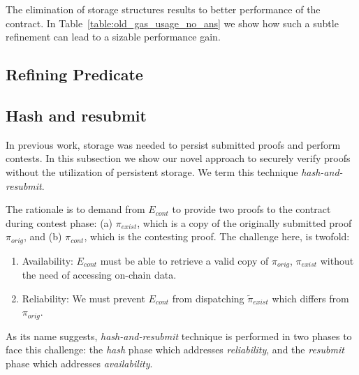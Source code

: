 

The elimination of storage structures results to better performance of the
contract. In Table~\ref{table:old_gas_usage_no_ans} we show how such a subtle
refinement can lead to a sizable performance gain.



\subsection{Refining Predicate}


\subsection{Hash and resubmit}

In previous work, storage was needed to persist submitted proofs and perform
contests. In this subsection we show our novel approach to securely verify
proofs without the utilization of persistent storage. We term this technique
\emph{hash-and-resubmit}.

The rationale is to demand from $E_{cont}$ to provide two proofs to the
contract during contest phase: (a) $\pi_{exist}$, which is a copy of the
originally submitted proof $\pi_{orig}$, and (b) $\pi_{cont}$, which is the
contesting proof. The challenge here, is twofold:

\begin{enumerate}

    \item Availability: $E_{cont}$ must be able to retrieve a valid copy of $\pi_{orig}$,
        $\pi_{exist}$ without the need of accessing on-chain data.

    \item Reliability: We must prevent $E_{cont}$ from dispatching
        $\tilde\pi_{exist}$ which differs from $\pi_{orig}$.

\end{enumerate}

As its name suggests, \emph{hash-and-resubmit} technique is performed in two
phases to face this challenge: the \emph{hash} phase which addresses
\emph{reliability}, and the \emph{resubmit} phase which addresses
\emph{availability}.


